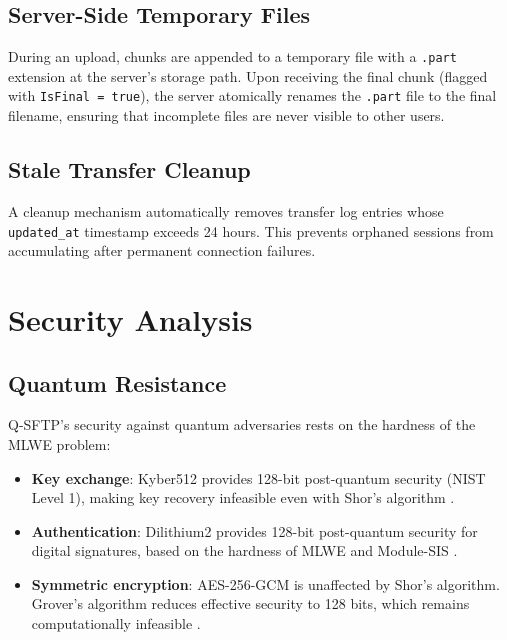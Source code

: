 \documentclass[12pt, a4paper]{article}
\begin{document}
\subsection{Server-Side Temporary Files}

During an upload, chunks are appended to a temporary file with a \texttt{.part} extension at the server's storage path. Upon receiving the final chunk (flagged with \texttt{IsFinal = true}), the server atomically renames the \texttt{.part} file to the final filename, ensuring that incomplete files are never visible to other users.

\subsection{Stale Transfer Cleanup}

A cleanup mechanism automatically removes transfer log entries whose \texttt{updated\_at} timestamp exceeds 24 hours. This prevents orphaned sessions from accumulating after permanent connection failures.

\section{Security Analysis}
\label{sec:security}

\subsection{Quantum Resistance}

Q-SFTP's security against quantum adversaries rests on the hardness of the MLWE problem:

\begin{itemize}[itemsep=2pt]
    \item \textbf{Key exchange}: Kyber512 provides 128-bit post-quantum security (NIST Level 1), making key recovery infeasible even with Shor's algorithm \parencite{bos2018crystals}.
    \item \textbf{Authentication}: Dilithium2 provides 128-bit post-quantum security for digital signatures, based on the hardness of MLWE and Module-SIS \parencite{ducas2018crystals}.
    \item \textbf{Symmetric encryption}: AES-256-GCM is unaffected by Shor's algorithm. Grover's algorithm reduces effective security to 128 bits, which remains computationally infeasible \parencite{grover1996fast}.
\end{itemize}
\end{document}
